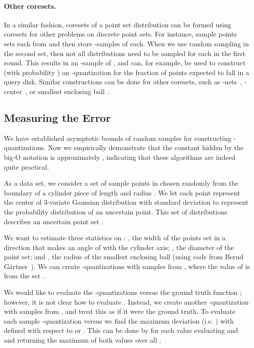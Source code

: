 \documentclass{journal}
\begin{document}
\paragraph{Other coresets.}
In a similar fashion, coresets of a point set distribution  can be formed using coresets for other problems on discrete point sets.  For instance, sample  points sets  each from  and then store -samples  of each.
When we use random sampling in the second set, then not all distributions  need to be sampled for each  in the first round.  
This results in an -sample of , and can, for example, be used to construct (with probability ) an -quantization for the fraction of points expected to fall in a query disk.
Similar constructions can be done for other coresets, such as -nets~\cite{HW87}, -center~\cite{APV02}, or smallest enclosing ball~\cite{BC03}.




\subsection{Measuring the Error}

We have established asymptotic bounds of  random samples for constructing -quantizations.  Now we empirically demonstrate that the constant hidden by the big-O notation is approximately , indicating that these algorithms are indeed quite practical.

As a data set, we consider a set of  sample points in  chosen randomly from the boundary of a cylinder piece of length  and radius .  We let each point represent the center of 3-variate Gaussian distribution with standard deviation  to represent the probability distribution of an uncertain point.  This set of distributions describes an uncertain point set .

We want to estimate three statistics on :
, the width of the points set in a direction that makes an angle of  with the cylinder axis;
, the diameter of the point set;
and , the radius of the smallest enclosing ball (using code from Bernd G\"{a}rtner~\cite{Gar99}).
We can create -quantizations with  samples from , where the value of  is from the set .

We would like to evaluate the -quantizations versus the ground truth function ; however, it is not clear how to evaluate .  Instead, we create another -quantization  with  samples from , and treat this as if it were the ground truth.
To evaluate each sample -quantization  versus  we find the maximum deviation (i.e. ) with  defined with respect to  or .  This can be done by for each value  evaluating  and  and returning the maximum of both values over all .  
\end{document}
